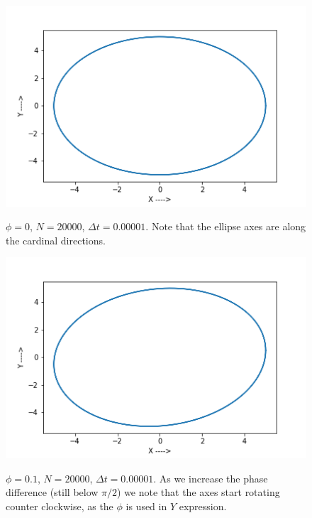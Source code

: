 \documentclass{report}
\begin{document}
\begin{figure}[H]
	\centering
	\includegraphics[width = \textwidth]{phi1.png}
	\label{phi1}
	\caption{$\phi=0$, $N=20000$, $\Delta t=0.00001$. Note that the ellipse axes are along the cardinal directions.}
\end{figure}

\begin{figure}[H]
\centering
\includegraphics[width = \textwidth]{phi2.png}
\label{phi2}
\caption{$\phi=0.1$, $N=20000$, $\Delta t=0.00001$. As we increase the phase difference (still below $\pi/2$) we note that the axes start rotating counter clockwise, as the $\phi$ is used in $Y$ expression.}
\end{figure}
\end{document}
